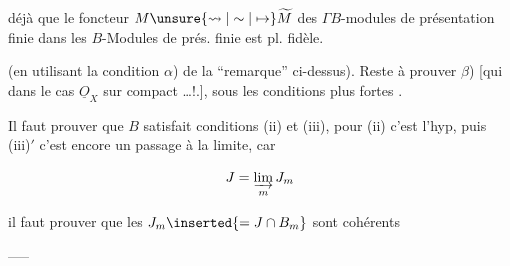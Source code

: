 déjà que le foncteur $M\unsure{\leadsto|\sim|\mapsto}\widetilde M$ des $\Gamma B$-modules de présentation finie dans les $B$-Modules de prés. finie est pl. fidèle.



(en utilisant  la condition $\alpha$) de la \textquotedblleft remarque\textquotedblright{} ci-dessus). Reste à prouver $\beta$) [qui  dans le cas $\underline O_X$  sur  compact \ldots !.], sous les conditions plus fortes .

Il faut prouver que $B$ satisfait conditions (ii) et (iii), pour (ii) c'est l'hyp, puis (iii)$'$ c'est encore un passage à la limite, car

\[
 J=\varinjlim_m J_m
\]

il faut prouver que les $J_m\inserted{=J\cap B_m}$ sont cohérents

-----
